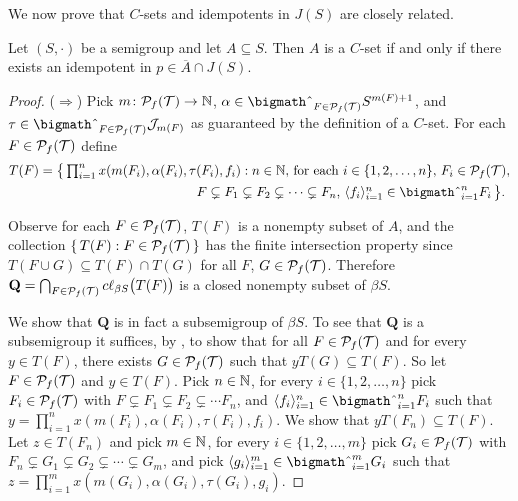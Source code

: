 We now prove that $C$-sets and idempotents in $J(S)$ are closely related.
\begin{thm}
  \label{thm:csets}
  Let $(S, \cdot)$ be a semigroup and let $A \subseteq S$. 
  Then $A$ is a $C$-set if and only if there exists an idempotent in $p \in \overline{A} \cap J(S)$.
\end{thm}
\begin{proof}
  ($\Rightarrow$)
  Pick $m \colon \mathcal{P}_f(\mathcal{T}) \to \mathbb{N}$, $\alpha \in \bigtimes_{F \in \Pf(\calT)} S^{m(F)+1}$, and $\tau \in \bigtimes_{F \in \Pf(\calT)} \calJ_{m(F)}$ as guaranteed by the definition of a $C$-set. 
  For each $F \in \mathcal{P}_f(\mathcal{T})$ define 
  \begin{align*}
    T(F) &= \bigl\{\, \textstyle \prod_{i=1}^n x(m(F_i), \alpha(F_i), \tau(F_i), f_i) : \mbox{$n \in \bbN$, for each $i \in \{1, 2, \ldots, n\}$, $F_i \in \Pf(\calT)$,}\\
 &\hspace{12em}\mbox{$F \subsetneq F_1 \subsetneq F_2 \subsetneq \cdots \subsetneq F_n$, $\la f_i \ra_{i=1}^n \in \bigtimes_{i=1}^n F_i$} \,\bigr\}.
  \end{align*}

  Observe for each $F \in \mathcal{P}_f(\mathcal{T})$, $T(F)$ is a nonempty subset of $A$, and the collection $\{\, T(F) : F \in \mathcal{P}_f(\mathcal{T}) \,\}$ has the finite intersection property since $T(F \cup G) \subseteq T(F) \cap T(G)$ for all $F$, $G \in \mathcal{P}_f(\mathcal{T})$.
  Therefore $\mathbf{Q} = \bigcap_{F \in \mathcal{P}_f(\mathcal{T})} c\ell_{\beta S}\bigl(T(F)\bigr)$ is a closed nonempty subset of $\beta S$. 

  We show that $\mathbf{Q}$ is in fact a subsemigroup of $\beta S$.
  To see that $\mathbf{Q}$ is a subsemigroup it suffices, by \cite[Theorem 4.20]{Hindman:1998fk}, to show that for all $F \in \mathcal{P}_f(\mathcal{T})$ and for every $y \in T(F)$, there exists $G \in \mathcal{P}_f(\mathcal{T})$ such that $yT(G) \subseteq T(F)$. 
  So let $F \in \mathcal{P}_f(\mathcal{T})$ and $y \in T(F)$.
  Pick $n \in \mathbb{N}$, for every $i \in \{1, 2, \ldots, n\}$ pick $F_i \in \mathcal{P}_f(\mathcal{T})$ with $F \subsetneq F_1 \subsetneq F_2 \subsetneq \cdots F_n$, and $\la f_i \ra_{i=1}^n \in \bigtimes_{i=1}^n F_i$ such that $y = \prod_{i=1}^n x(m(F_i), \alpha(F_i), \tau(F_i), f_i)$. 
  We show that $yT(F_n) \subseteq T(F)$.
  Let $z \in T(F_n)$ and pick $m \in \mathbb{N}$, for every $i \in \{1, 2, \ldots, m\}$ pick $G_i \in \mathcal{P}_f(\mathcal{T})$ with $F_n \subsetneq G_1 \subsetneq G_2 \subsetneq \cdots \subsetneq G_m$, and pick $\la g_i \ra_{i=1}^m \in \bigtimes_{i=1}^m G_i$ such that $z = \prod_{i=1}^m x(m(G_i), \alpha(G_i), \tau(G_i), g_i)$.


\end{proof}

